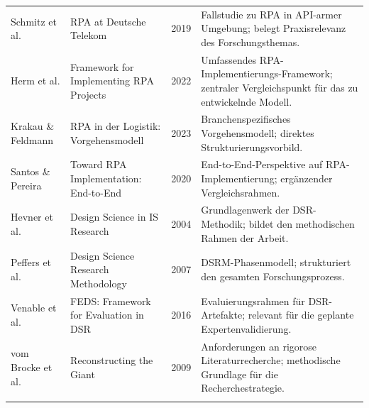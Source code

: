 \begin{longtable}{P{3.0cm}P{4.3cm}P{1.0cm}P{5.0cm}}
Schmitz et al. & \ac{RPA} at Deutsche Telekom & 2019 & Fallstudie zu \ac{RPA} in \acs{API}-armer Umgebung; belegt Praxisrelevanz des Forschungsthemas. \\
\addlinespace
 
Herm et al. & Framework for Implementing \ac{RPA} Projects & 2022 & Umfassendes \acs{RPA}-Implementierungs-Framework; zentraler Vergleichspunkt für das zu entwickelnde Modell. \\
\addlinespace
 
Krakau \& Feldmann & \ac{RPA} in der Logistik: Vorgehensmodell & 2023 & Branchenspezifisches Vorgehensmodell; direktes Strukturierungsvorbild. \\
\addlinespace
 
Santos \& Pereira & Toward \ac{RPA} Implementation: End-to-End & 2020 & End-to-End-Perspektive auf \acs{RPA}-Implementierung; ergänzender Vergleichsrahmen. \\
\addlinespace
 
Hevner et al. & Design Science in \acs{IS} Research & 2004 & Grundlagenwerk der \acs{DSR}-Methodik; bildet den methodischen Rahmen der Arbeit. \\
\addlinespace
 
Peffers et al. & Design Science Research Methodology & 2007 & \acs{DSRM}-Phasenmodell; strukturiert den gesamten Forschungsprozess. \\
\addlinespace
 
Venable et al. & \acs{FEDS}: Framework for Evaluation in \ac{DSR} & 2016 & Evaluierungsrahmen für \acs{DSR}-Artefakte; relevant für die geplante Expertenvalidierung. \\
\addlinespace
 
vom Brocke et al. & Reconstructing the Giant & 2009 & Anforderungen an rigorose Literaturrecherche; methodische Grundlage für die Recherchestrategie. \\
\addlinespace
 
\end{longtable}
\endgroup



